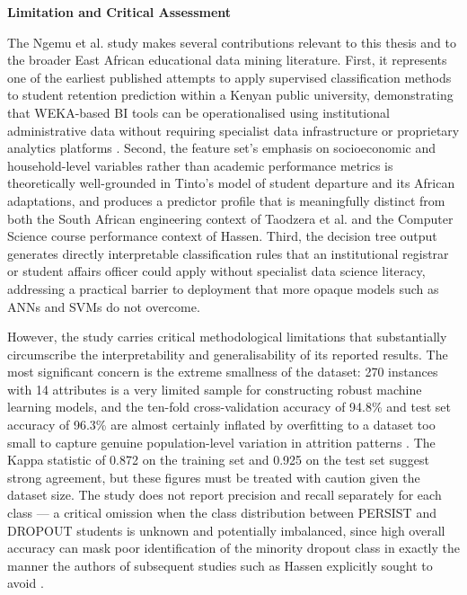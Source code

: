 \documentclass[12pt]{report}
\begin{document}
\textbf{Limitation and Critical Assessment}

The Ngemu et al. study makes several contributions relevant to this thesis and to the broader East African educational 
data mining literature. First, it represents one of the earliest published attempts to apply supervised classification 
methods to student retention prediction within a Kenyan public university, demonstrating that WEKA-based BI tools can 
be operationalised using institutional administrative data without requiring specialist data infrastructure or proprietary
 analytics platforms \parencite{Ngemu2015}. Second, the feature set's emphasis on socioeconomic and household-level variables
  rather than academic performance metrics is theoretically well-grounded in Tinto's model of student departure and its 
  African adaptations, and produces a predictor profile that is meaningfully distinct from both the South African engineering 
  context of Taodzera et al. and the Computer Science course performance context of Hassen. Third, the decision tree output
   generates directly interpretable classification rules that an institutional registrar or student affairs officer could 
   apply without specialist data science literacy, addressing a practical barrier to deployment that more opaque models 
   such as ANNs and SVMs do not overcome.

However, the study carries critical methodological limitations that substantially circumscribe the interpretability and
 generalisability of its reported results. The most significant concern is the extreme smallness of the dataset: 270 
 instances with 14 attributes is a very limited sample for constructing robust machine learning models, and the ten-fold 
 cross-validation accuracy of 94.8\% and test set accuracy of 96.3\% are almost certainly inflated by overfitting to a 
 dataset too small to capture genuine population-level variation in attrition patterns \parencite{Ngemu2015}. The Kappa 
 statistic of 0.872 on the training set and 0.925 on the test set suggest strong agreement, but these figures must be
  treated with caution given the dataset size. The study does not report precision and recall separately for each
   class --- a critical omission when the class distribution between PERSIST and DROPOUT students is unknown and 
   potentially imbalanced, since high overall accuracy can mask poor identification of the minority dropout class 
   in exactly the manner the authors of subsequent studies such as Hassen explicitly sought to avoid \parencite{Ngemu2015}.
\end{document}
